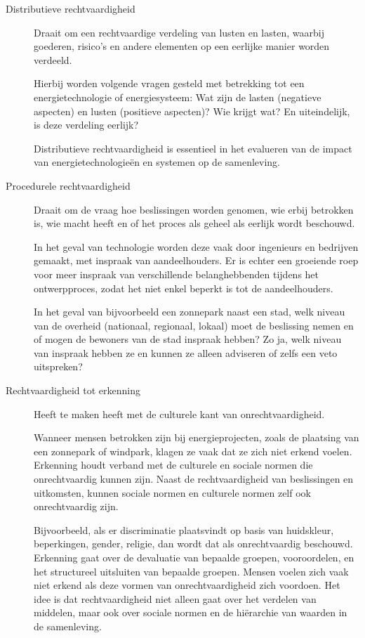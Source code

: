 \documentclass[../summary.tex]{subfiles}
\begin{document}
	\begin{description}
		\item[Distributieve rechtvaardigheid] Draait om een rechtvaardige verdeling van lusten en lasten, waarbij goederen, risico's en andere elementen op een eerlijke manier worden verdeeld. 
		
		Hierbij worden volgende vragen gesteld met betrekking tot een energietechnologie of energiesysteem: Wat zijn de lasten (negatieve aspecten) en lusten (positieve aspecten)? Wie krijgt wat? En uiteindelijk, is deze verdeling eerlijk?
		
		Distributieve rechtvaardigheid is essentieel in het evalueren van de impact van energietechnologieën en systemen op de samenleving.
		
		\item[Procedurele rechtvaardigheid] Draait om de vraag hoe beslissingen worden genomen, wie erbij betrokken is, wie macht heeft en of het proces als geheel als eerlijk wordt beschouwd.
		
		In het geval van technologie worden deze vaak door ingenieurs en bedrijven gemaakt, met inspraak van aandeelhouders. Er is echter een groeiende roep voor meer inspraak van verschillende belanghebbenden tijdens het ontwerpproces, zodat het niet enkel beperkt is tot de aandeelhouders.
		
		In het geval van bijvoorbeeld een zonnepark naast een stad, welk niveau van de overheid (nationaal, regionaal, lokaal) moet de beslissing nemen en of mogen de bewoners van de stad inspraak hebben? Zo ja, welk niveau van inspraak hebben ze en kunnen ze alleen adviseren of zelfs een veto uitspreken?
		
		\item[Rechtvaardigheid tot erkenning] Heeft te maken heeft met de culturele kant van onrechtvaardigheid. 
		
		Wanneer mensen betrokken zijn bij energieprojecten, zoals de plaatsing van een zonnepark of windpark, klagen ze vaak dat ze zich niet erkend voelen. Erkenning houdt verband met de culturele en sociale normen die onrechtvaardig kunnen zijn. Naast de rechtvaardigheid van beslissingen en uitkomsten, kunnen sociale normen en culturele normen zelf ook onrechtvaardig zijn. 
		
		Bijvoorbeeld, als er discriminatie plaatsvindt op basis van huidskleur, beperkingen, gender, religie, dan wordt dat als onrechtvaardig beschouwd. Erkenning gaat over de devaluatie van bepaalde groepen, vooroordelen, en het structureel uitsluiten van bepaalde groepen. Mensen voelen zich vaak niet erkend als deze vormen van onrechtvaardigheid zich voordoen. Het idee is dat rechtvaardigheid niet alleen gaat over het verdelen van middelen, maar ook over sociale normen en de hiërarchie van waarden in de samenleving.
	\end{description}
		
\end{document}
